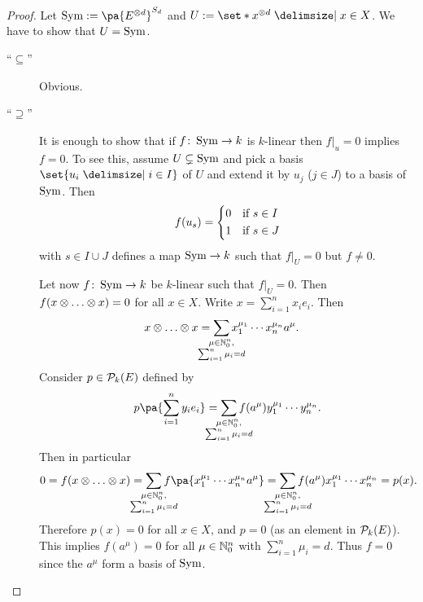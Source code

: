 \documentclass[12pt,a4paper]{scrartcl}
\theoremstyle{cplain}
\theoremstyle{cplain}
\theoremstyle{cplain}
\theoremstyle{definition}
\begin{document}
\begin{otherlanguage}{english}
\begin{proof}
  Let $\Sym := \pa{E^{\tp d}}^{S_d}$ and $U := \set*{x^{\tp d}\given x \in X}$. We have to show that $U = \operatorname{Sym}$.
  \begin{description}
    \item[\enquote{$\subseteq$}] Obvious.
    \item[\enquote{$\supseteq$}] It is enough to show that if $f \colon \operatorname{Sym} \to k$ is $k$-linear then $f|_u = 0$ implies $f = 0$. To see this, assume $U \subsetneq \operatorname{Sym}$ and pick a basis $\set{u_i\given i\in I}$ of $U$ and extend it by $u_j$ ($j\in J$) to a basis of $\operatorname{Sym}$. Then \[ f(u_s) = \begin{cases*}0 & if $s \in I$\\ 1 & if $s \in J$\end{cases*} \] with $s \in I\cup J$ defines a map $\operatorname{Sym} \to k$ such that $f|_U =0$ but $f\neq 0$.
    
    Let now $f\colon \operatorname{Sym} \to k$ be $k$-linear such that $f|_U = 0$. Then $f(x\otimes \ldots \otimes x) =0$ for all $x \in X$. Write $x = \sum_{i=1}^nx_ie_i$. Then
    \begin{align*}
      x \tp \ldots \tp x &= \sum_{\mathclap{\substack{\mu \in \IN_0^n, \\ \sum_{i=1}^n\mu_i = d}}} x_1^{\mu_1}\cdots x_n^{\mu_n} a^\mu.
    \end{align*}
    Consider $p\in\mathcal{P}_k(E)$ defined by \[ p\pa{\sum_{i=1}^ny_ie_i} = \sum_{\mathclap{\substack{\mu \in \IN_0^n, \\ \sum_{i=1}^n\mu_i = d}}} f(a^\mu)y_1^{\mu_1}\cdots y_n^{\mu_n}. \]
    Then in particular
    \begin{align*}
      0 = f(x \tp \ldots \tp x) = \sum_{\mathclap{\substack{\mu \in \IN_0^n, \\ \sum_{i=1}^n\mu_i = d}}} f\pa{x_1^{\mu_1}\cdots x_n^{\mu_n}a^\mu} = \sum_{\mathclap{\substack{\mu \in \IN_0^n, \\ \sum_{i=1}^n\mu_i = d}}} f(a^\mu)x_1^{\mu_1}\cdots x_n^{\mu_n} = p(x).
    \end{align*}
    Therefore $p(x) = 0$ for all $x\in X$, and $p=0$ (as an element in $\mathcal{P}_k(E)$). This implies $f(a^\mu) = 0$ for all $\mu \in \mathbb N_0^n$ with $\sum_{i=1}^n\mu_i = d$. Thus $f = 0$ since the $a^\mu$ form a basis of $\operatorname{Sym}$.
    \qedhere
  \end{description}
\end{proof}


\end{otherlanguage}
\end{document}
